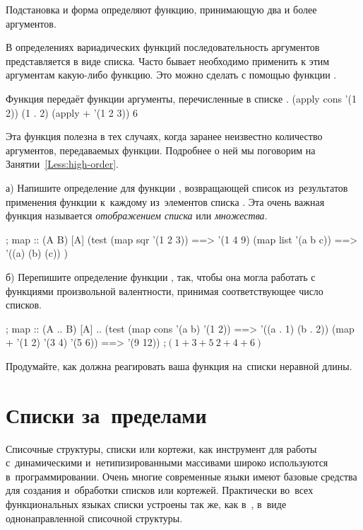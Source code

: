 \label{variadic-rewrite}Подстановка  и форма  определяют функцию, принимающую два и более аргументов.

В определениях вариадических функций последовательность аргументов представляется в виде списка. Часто бывает необходимо применить к этим аргументам какую-либо функцию. Это можно сделать с помощью функции .

\begin{example}{%
Функция  передаёт функции  аргументы, перечисленные в списке .}
\REPL
  {(apply cons '(1 2))}
  {(1 . 2)}
\REPL
  {(apply + '(1 2 3))}
  {6}
\end{example}

Эта функция полезна в тех случаях, когда заранее неизвестно количество аргументов, передаваемых функции. Подробнее о ней мы поговорим на Занятии~\ref{Less:high-order}.

\begin{Assignment}
а) Напишите определение для функции , возвращающей список из~результатов применения функции  к~каждому из~элементов списка . Эта очень важная функция называется \emph{отображением списка} или \emph{множества}.
\begin{Specification}
; map :: (A \arrow B) [A] \arrow [B]
(test 
  (map sqr '(1 2 3))  ==> '(1 4 9)
  (map list '(a b c)) ==> '((a) (b) (c)) )
\end{Specification}

б) Перепишите определение функции , так, чтобы она могла работать с функциями произвольной валентности, принимая соответствующее число списков.
\begin{Specification}
; map :: (A .. \arrow B) [A] .. \arrow [B]
(test 
  (map cons '(a b) '(1 2))    ==> '((a . 1) (b . 2))
  (map + '(1 2) '(3 4) '(5 6)) ==> '(9 12)) ;$(1+3+5\ 2+4+6)$
\end{Specification}

Продумайте, как должна реагировать ваша функция на~списки неравной длины.
\end{Assignment}



\section{Списки за~пределами~\Scheme}%
Списочные структуры, списки или кортежи, как инструмент для работы с~динамическими и~нетипизированными массивами широко используются в~программировании. Очень многие современные языки имеют базовые средства для создания и~обработки списков или кортежей. Практически во~всех функциональных языках списки устроены так же, как в~\Scheme, в~виде однонаправленной списочной структуры.

